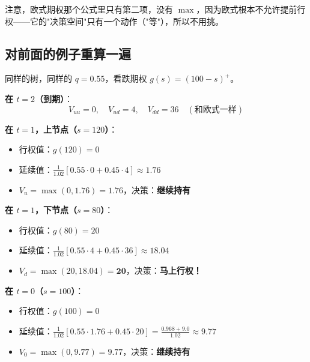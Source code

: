 \documentclass[11pt,a4paper]{ctexart}
\newcommand{\1}{\mathbf{1}}
\begin{document}
注意，欧式期权那个公式里只有第二项，没有 $\max$，因为欧式根本不允许提前行权——它的"决策空间"只有一个动作（"等"），所以不用挑。

\subsection{对前面的例子重算一遍}

同样的树，同样的 $q = 0.55$，看跌期权 $g(s) = (100 - s)^+$。

\textbf{在 $t = 2$（到期）}：
\[
V_{uu} = 0, \quad V_{ud} = 4, \quad V_{dd} = 36 \quad (\text{和欧式一样})
\]

\textbf{在 $t = 1$，上节点（$s = 120$）}：
\begin{itemize}
    \item 行权值：$g(120) = 0$
    \item 延续值：$\frac{1}{1.02}[0.55 \cdot 0 + 0.45 \cdot 4] \approx 1.76$
    \item $V_u = \max(0, 1.76) = 1.76$，决策：\textcolor{accentgreen}{\bfseries 继续持有}
\end{itemize}

\textbf{在 $t = 1$，下节点（$s = 80$）}：
\begin{itemize}
    \item 行权值：$g(80) = 20$
    \item 延续值：$\frac{1}{1.02}[0.55 \cdot 4 + 0.45 \cdot 36] \approx 18.04$
    \item $V_d = \max(20, 18.04) = \mathbf{20}$，决策：\textcolor{accentred}{\bfseries 马上行权！}
\end{itemize}

\textbf{在 $t = 0$（$s = 100$）}：
\begin{itemize}
    \item 行权值：$g(100) = 0$
    \item 延续值：$\frac{1}{1.02}[0.55 \cdot 1.76 + 0.45 \cdot 20] = \frac{0.968 + 9.0}{1.02} \approx 9.77$
    \item $V_0 = \max(0, 9.77) = 9.77$，决策：\textcolor{accentgreen}{\bfseries 继续持有}
\end{itemize}
\end{document}
